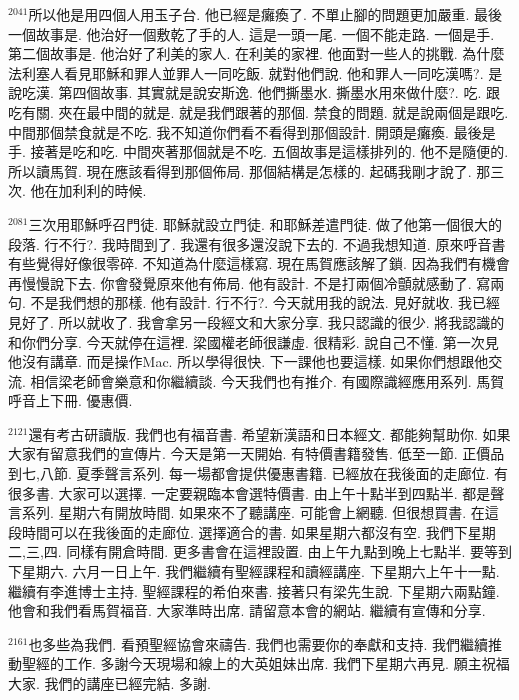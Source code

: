 \documentclass{book}
\begin{document}
$^{2041}$所以他是用四個人用玉子台.
他已經是癱瘓了.
不單止腳的問題更加嚴重.
最後一個故事是.
他治好一個敷乾了手的人.
這是一頭一尾.
一個不能走路.
一個是手.
第二個故事是.
他治好了利美的家人.
在利美的家裡.
他面對一些人的挑戰.
為什麼法利塞人看見耶穌和罪人並罪人一同吃飯.
就對他們說.
他和罪人一同吃漢嗎?.
是說吃漢.
第四個故事.
其實就是說安斯逸.
他們撕墨水.
撕墨水用來做什麼?.
吃.
跟吃有關.
夾在最中間的就是.
就是我們跟著的那個.
禁食的問題.
就是說兩個是跟吃.
中間那個禁食就是不吃.
我不知道你們看不看得到那個設計.
開頭是癱瘓.
最後是手.
接著是吃和吃.
中間夾著那個就是不吃.
五個故事是這樣排列的.
他不是隨便的.
所以讀馬賀.
現在應該看得到那個佈局.
那個結構是怎樣的.
起碼我剛才說了.
那三次.
他在加利利的時候.

$^{2081}$三次用耶穌呼召門徒.
耶穌就設立門徒.
和耶穌差遣門徒.
做了他第一個很大的段落.
行不行?.
我時間到了.
我還有很多還沒說下去的.
不過我想知道.
原來呼音書有些覺得好像很零碎.
不知道為什麼這樣寫.
現在馬賀應該解了鎖.
因為我們有機會再慢慢說下去.
你會發覺原來他有佈局.
他有設計.
不是打兩個冷顫就感動了.
寫兩句.
不是我們想的那樣.
他有設計.
行不行?.
今天就用我的說法.
見好就收.
我已經見好了.
所以就收了.
我會拿另一段經文和大家分享.
我只認識的很少.
將我認識的和你們分享.
今天就停在這裡.
梁國權老師很謙虛.
很精彩.
說自己不懂.
第一次見他沒有講章.
而是操作Mac.
所以學得很快.
下一課他也要這樣.
如果你們想跟他交流.
相信梁老師會樂意和你繼續談.
今天我們也有推介.
有國際識經應用系列.
馬賀呼音上下冊.
優惠價.

$^{2121}$還有考古研讀版.
我們也有福音書.
希望新漢語和日本經文.
都能夠幫助你.
如果大家有留意我們的宣傳片.
今天是第一天開始.
有特價書籍發售.
低至一節.
正價品到七,八節.
夏季聲言系列.
每一場都會提供優惠書籍.
已經放在我後面的走廊位.
有很多書.
大家可以選擇.
一定要親臨本會選特價書.
由上午十點半到四點半.
都是聲言系列.
星期六有開放時間.
如果來不了聽講座.
可能會上網聽.
但很想買書.
在這段時間可以在我後面的走廊位.
選擇適合的書.
如果星期六都沒有空.
我們下星期二,三,四.
同樣有開倉時間.
更多書會在這裡設置.
由上午九點到晚上七點半.
要等到下星期六.
六月一日上午.
我們繼續有聖經課程和讀經講座.
下星期六上午十一點.
繼續有李進博士主持.
聖經課程的希伯來書.
接著只有梁先生說.
下星期六兩點鐘.
他會和我們看馬賀福音.
大家準時出席.
請留意本會的網站.
繼續有宣傳和分享.

$^{2161}$也多些為我們.
看預聖經協會來禱告.
我們也需要你的奉獻和支持.
我們繼續推動聖經的工作.
多謝今天現場和線上的大英姐妹出席.
我們下星期六再見.
願主祝福大家.
我們的講座已經完結.
多謝.
\newpage
\end{document}

